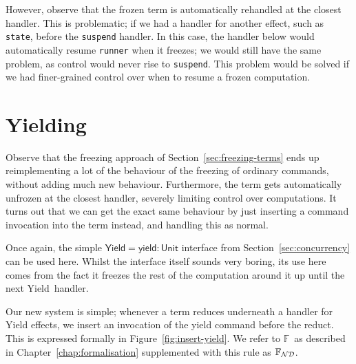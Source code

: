 \documentclass[msc,deptreport,cs]{infthesis} %
\newcommand{\code}[1]{\lstinline{#1}}
\newcommand\nondetfrank{$\mathbb{F}_{\cal{ND}}$}
\newcommand\purefrank{$\mathbb{F}$}
\newcommand\yield{\textsf{yield}\xspace}
\newcommand\Yield{\textsf{Yield}\xspace}
\newcommand{\todo}[1]
           {{\par\noindent\small\color{RoyalPurple}
  \framebox{\parbox{\dimexpr\linewidth-2\fboxsep-2\fboxrule}
    {\textbf{TODO:} #1}}}}
\begin{document}
However, observe that the frozen term is automatically rehandled at the closest
handler. This is problematic; if we had a handler for another effect, such as
\code{state}, before the \code{suspend} handler. In this case, the handler below
would automatically resume \code{runner} when it freezes; we would still have
the same problem, as control would never rise to \code{suspend}. This problem
would be solved if we had finer-grained control over when to resume a frozen
computation.

\todo{Rewrite above paragraph}

\section{Yielding}
\label{sec:inserting-yields}

Observe that the freezing approach of Section~\ref{sec:freezing-terms} ends up
reimplementing a lot of the behaviour of the freezing of ordinary commands,
without adding much new behaviour. Furthermore, the term gets automatically
unfrozen at the closest handler, severely limiting control over computations. It
turns out that we can get the exact same behaviour by just inserting a command
invocation into the term instead, and handling this as normal.
%

Once again, the simple $\Yield = \yield : \textsf{Unit}$ interface from
Section~\ref{sec:concurrency} can be used here. Whilst the interface itself
sounds very boring, its use here comes from the fact it freezes the rest of the
computation around it up until the next \Yield~handler.


Our new system is simple; whenever a term reduces underneath a handler for
\Yield effects, we insert an invocation of the \yield command before the reduct.
This is expressed formally in Figure~\ref{fig:insert-yield}. We refer to
\purefrank~as described in Chapter~\ref{chap:formalisation} supplemented with
this rule as \nondetfrank.
\end{document}
